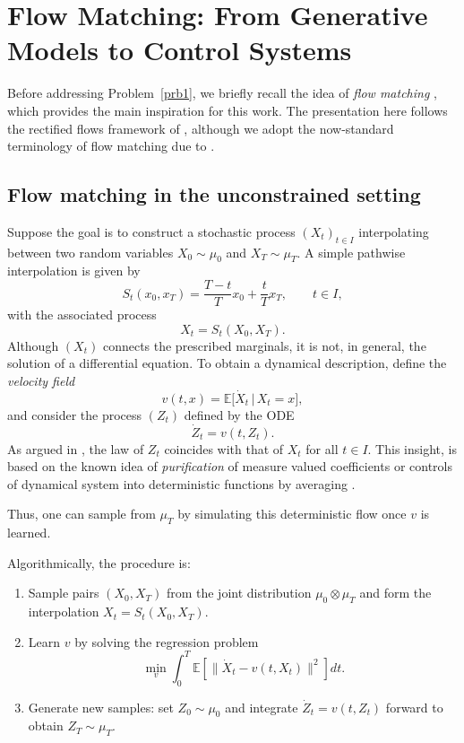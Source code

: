 \documentclass{article}
\begin{document}
\section{Flow Matching: From Generative Models to Control Systems}

Before addressing Problem~\ref{prb1}, we briefly recall the idea of \emph{flow matching} 
\cite{liu2022flow,lipmanflow,albergo2023stochastic}, which provides the main inspiration for this work. 
The presentation here follows the rectified flows framework of \cite{liu2022flow}, although we adopt the 
now-standard terminology of flow matching due to \cite{lipmanflow}.

\subsection{Flow matching in the unconstrained setting}

Suppose the goal is to construct a stochastic process $(X_t)_{t\in I}$ interpolating between two random 
variables $X_0 \sim \mu_0$ and $X_T \sim \mu_T$. A simple pathwise interpolation is given by
\[
S_t(x_0,x_T) = \frac{T-t}{T}x_0 + \frac{t}{T}x_T, \qquad t \in I,
\]
with the associated process
\[
X_t = S_t(X_0,X_T).
\]
Although $(X_t)$ connects the prescribed marginals, it is not, in general, the solution of a differential 
equation. To obtain a dynamical description, define the \emph{velocity field}
\[
v(t,x) = \mathbb{E}\big[\dot{X}_t \,\big|\, X_t = x\big],
\]
and consider the process $(Z_t)$ defined by the ODE
\[
\dot{Z}_t = v(t,Z_t).
\]
As argued in \cite{liu2022flow,lipmanflow,albergo2023stochastic}, the law of $Z_t$ coincides with that of 
$X_t$ for all $t\in I$.  This insight, is based on the known idea of {\it purification} of measure valued coefficients or controls of dynamical system  into deterministic functions by averaging \cite{balder1998lectures,gyongy1986mimicking,lisini2006absolutely,bernard2008young}. 

Thus, one can sample from $\mu_T$ by simulating this deterministic flow once 
$v$ is learned.

Algorithmically, the procedure is:

\begin{enumerate}
    \item Sample pairs $(X_0,X_T)$ from the joint distribution $\mu_0 \otimes \mu_T$ and form the 
    interpolation $X_t=S_t(X_0,X_T)$.
    \item Learn $v$ by solving the regression problem
    \[
    \min_{v} \int_0^T \mathbb{E}\!\left[ \| \dot{X}_t - v(t,X_t) \|^2 \right] dt.
    \]
    \item Generate new samples: set $Z_0 \sim \mu_0$ and integrate $\dot{Z}_t=v(t,Z_t)$ forward to obtain 
    $Z_T \sim \mu_T$.
\end{enumerate}
\end{document}
